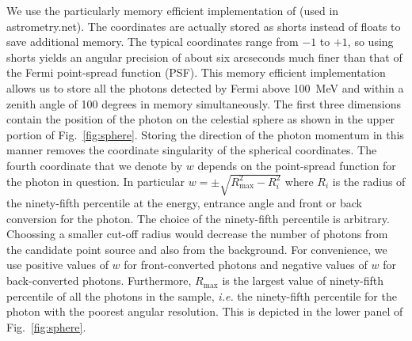 \documentclass[useAMS,usenatbib]{mn2e}
\begin{document}
We use the particularly memory efficient implementation of
\citet{LangPhD} (used in astrometry.net).  The coordinates are
actually stored as shorts instead of floats to save additional memory.
The typical coordinates range from $-1$ to $+1$, so using shorts
yields an angular precision of about six arcseconds much finer than
that of the Fermi point-spread function (PSF). This memory efficient
implementation allows us to store all the photons detected by Fermi
above 100~MeV and within a zenith angle of 100 degrees in memory
simultaneously.  The first three dimensions contain the position of
the photon on the celestial sphere as shown in the upper portion of
Fig.~\ref{fig:sphere}.  Storing the direction of the photon momentum
in this manner removes the coordinate singularity of the spherical
coordinates.
The fourth
coordinate that we denote by $w$ depends on the point-spread function
for the photon in question.  In particular $w=\pm
\sqrt{R^2_\mathrm{max}-R_i^2}$ where $R_i$ is the radius of the
ninety-fifth percentile at the energy, entrance angle and front or
back conversion for the photon.  The choice of the ninety-fifth
percentile is arbitrary.  Choossing a smaller cut-off radius would
decrease the number of photons from the candidate point source and also
from the background.  For convenience, we use positive values of $w$
for front-converted photons and negative values of $w$ for
back-converted photons.  Furthermore, $R_\mathrm{max}$ is the largest
value of ninety-fifth percentile of all the photons in the sample,
{\em i.e.} the ninety-fifth percentile for the photon with the poorest
angular resolution.  This is depicted in the lower panel of
Fig.~\ref{fig:sphere}.
\end{document}
